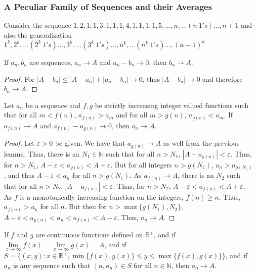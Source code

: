 \documentclass[crop=false,class=book,oneside]{standalone}
\begin{document}
            \subsubsection{A Peculiar Family of Sequences and their Averages}
            Consider the sequence $1,2,1,1,3,1,1,1,4,1,1,1,1,5,\hdots, n,\hdots (n\ 1's)\hdots, n+1$ and also the generalization $1^k, 2^k,\hdots (2^k\ 1's)\hdots, 3^k, \hdots (3^k\ 1's)\hdots, n^k, \hdots (n^k\ 1's)\hdots, (n+1)^k$
            \begin{lemma}
            If $a_n, b_n$ are sequences, $a_n\rightarrow A$ and $a_n-b_n\rightarrow 0$, then $b_n \rightarrow A$.
            \end{lemma}
            \begin{proof}
            For $|A-b_n| \leq |A-a_n|+|a_n-b_n| \rightarrow 0$, thus $|A-b_n|\rightarrow 0$ and therefore $b_n \rightarrow A$.
            \end{proof}
            \begin{lemma}
            Let $a_n$ be a sequence and $f,g$ be strictly increasing integer valued functions such that for all $m<f(n)$, $a_{f(n)}>a_m$ and for all $m>g(n)$, $a_{g(n)}<a_m$. If $a_{f(n)}\rightarrow A$ and $a_{f(n)}-a_{g(n)}\rightarrow 0$, then $a_n \rightarrow A$.
            \end{lemma}
            \begin{proof}
            Let $\varepsilon>0$ be given. We have that $a_{g(n)}\rightarrow A$ as well from the previous lemma. Thus, there is an $N_1 \in \mathbb{N}$ such that for all $n>N_1$, $|A-a_{g(n)}|<\varepsilon$. Thus, for $n>N_1$, $A-\varepsilon < a_{g(n)}<A+\varepsilon$. But for all integers $n>g(N_1)$, $a_n >a_{g(N_1)}$, and thus $A-\varepsilon < a_n$ for all $n>g(N_1)$. As $a_{f(n)}\rightarrow A$, there is an $N_2$ such that for all $n>N_2$, $|A-a_{f(n)}|<\varepsilon$. Thus, for $n>N_2$, $A-\varepsilon < a_{f(n)}<A+\varepsilon$. As $f$ is a monotonically increasing function on the integers, $f(n)\geq n$. Thus, $a_{f(n)}>a_n$ for all $n$. But then for $n>\max\{g(N_1),N_2\}$, $A-\varepsilon < a_{g(n)} < a_n < a_{f(n)}<A-\varepsilon$. Thus, $a_n \rightarrow A$.
            \end{proof}
            \begin{lemma}
            If $f$ and $g$ are continuous functions defined on $\mathbb{R}^+$, and if $\underset{x\rightarrow \infty}\lim f(x) = \underset{x\rightarrow \infty}\lim g(x)=A$, and if $S = \{(x,y):x\in \mathbb{R}^+,\min\{f(x),g(x)\}\leq y \leq \max\{f(x),g(x)\}\}$, and if $a_n$ is any sequence such that $(n,a_n)\in S$ for all $n\in \mathbb{N}$, then $a_n \rightarrow A$.
            \end{lemma}
\end{document}

